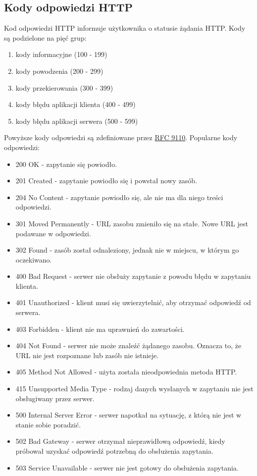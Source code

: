 	\subsection{Kody odpowiedzi HTTP}
		Kod odpowiedzi HTTP informuje użytkownika o statusie żądania HTTP. Kody są podzielone na pięć grup: \cite{MozillaHTTPStatuses}
		\begin{enumerate}
			\item kody informacyjne (100 - 199)
			\item kody powodzenia (200 - 299)
			\item kody przekierowania (300 - 399)
			\item kody błędu aplikacji klienta (400 - 499)
			\item kody błędu aplikacji serwera (500 - 599)
		\end{enumerate}
		Powyższe kody odpowiedzi są zdefiniowane przez \href{https://httpwg.org/specs/rfc9110.html#overview.of.status.codes}{RFC 9110}. Popularne kody odpowiedzi:
		\begin{itemize}
			\item 200 OK - zapytanie się powiodło.
			\item 201 Created - zapytanie powiodło się i powstał nowy zasób.
			\item 204 No Content - zapytanie powiodło się, ale nie ma dla niego treści odpowiedzi.
			\item 301 Moved Permanently - URL zasobu zmieniło się na stałe. Nowe URL jest podawane w odpowiedzi.
			\item 302 Found - zasób został odnaleziony, jednak nie w miejscu, w którym go oczekiwano.
			\item 400 Bad Request - serwer nie obsłuży zapytanie z powodu błędu w zapytaniu klienta.
			\item 401 Unauthorized - klient musi się uwierzytelnić, aby otrzymać odpowiedź od serwera.
			\item 403 Forbidden - klient nie ma uprawnień do zawartości.
			\item 404 Not Found - serwer nie może znaleźć żądanego zasobu. Oznacza to, że URL nie jest rozpoznane lub zasób nie istnieje.
			\item 405 Method Not Allowed - użyta została nieodpowiednia metoda HTTP.
			\item 415 Unsupported Media Type - rodzaj danych wysłanych w zapytaniu nie jest obsługiwany przez serwer.
			\item 500 Internal Server Error - serwer napotkał na sytuację, z którą nie jest w stanie sobie poradzić.
			\item 502 Bad Gateway - serwer otrzymał nieprawidłową odpowiedź, kiedy próbował uzyskać odpowiedź potrzebną do obsłużenia zapytania.
			\item 503 Service Unavailable - serwer nie jest gotowy do obsłużenia zapytania.
		\end{itemize}

